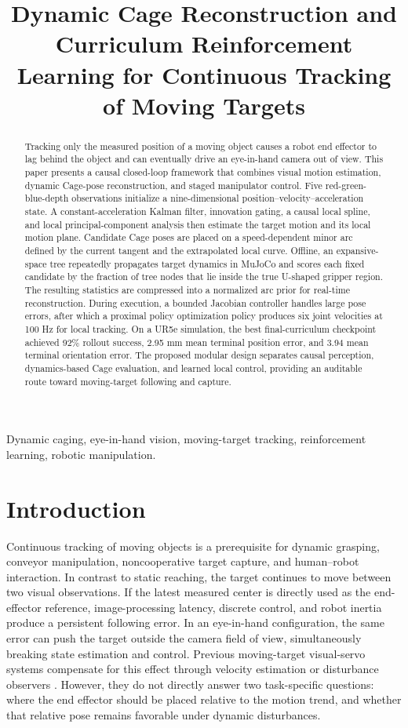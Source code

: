 \documentclass[conference]{IEEEtran}
\title{Dynamic Cage Reconstruction and Curriculum Reinforcement Learning for Continuous Tracking of Moving Targets}
\author{\IEEEauthorblockN{\mbox{}}\IEEEauthorblockA{\mbox{}}}
\begin{document}
\maketitle
\begin{abstract}
Tracking only the measured position of a moving object causes a robot end effector to lag behind the object and can eventually drive an eye-in-hand camera out of view. This paper presents a causal closed-loop framework that combines visual motion estimation, dynamic Cage-pose reconstruction, and staged manipulator control. Five red-green-blue-depth observations initialize a nine-dimensional position--velocity--acceleration state. A constant-acceleration Kalman filter, innovation gating, a causal local spline, and local principal-component analysis then estimate the target motion and its local motion plane. Candidate Cage poses are placed on a speed-dependent minor arc defined by the current tangent and the extrapolated local curve. Offline, an expansive-space tree repeatedly propagates target dynamics in MuJoCo and scores each fixed candidate by the fraction of tree nodes that lie inside the true U-shaped gripper region. The resulting statistics are compressed into a normalized arc prior for real-time reconstruction. During execution, a bounded Jacobian controller handles large pose errors, after which a proximal policy optimization policy produces six joint velocities at 100 Hz for local tracking. On a UR5e simulation, the best final-curriculum checkpoint achieved 92\% rollout success, 2.95 mm mean terminal position error, and 3.94\textdegree{} mean terminal orientation error. The proposed modular design separates causal perception, dynamics-based Cage evaluation, and learned local control, providing an auditable route toward moving-target following and capture.
\end{abstract}
\begin{IEEEkeywords}
Dynamic caging, eye-in-hand vision, moving-target tracking, reinforcement learning, robotic manipulation.
\end{IEEEkeywords}

\section{Introduction}

Continuous tracking of moving objects is a prerequisite for dynamic grasping, conveyor manipulation, noncooperative target capture, and human--robot interaction. In contrast to static reaching, the target continues to move between two visual observations. If the latest measured center is directly used as the end-effector reference, image-processing latency, discrete control, and robot inertia produce a persistent following error. In an eye-in-hand configuration, the same error can push the target outside the camera field of view, simultaneously breaking state estimation and control. Previous moving-target visual-servo systems compensate for this effect through velocity estimation or disturbance observers \cite{ref1,ref2,ref3}. However, they do not directly answer two task-specific questions: where the end effector should be placed relative to the motion trend, and whether that relative pose remains favorable under dynamic disturbances.
\end{document}

